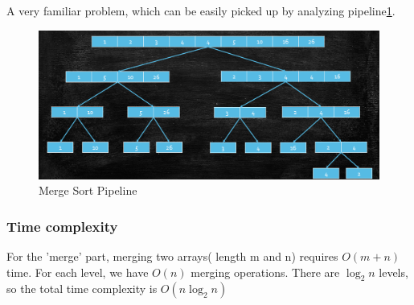 A very familiar problem, which can be easily picked up by analyzing pipeline\ref{fig:MergeSort}.
\begin{figure}
    \centering
    \includegraphics[width=0.8\linewidth]{Notes/fig/MergeSort.png}
    \caption{Merge Sort Pipeline}
    \label{fig:MergeSort}
\end{figure}

\subsubsection{Time complexity}
For the 'merge' part, merging two arrays( length m and n) requires $O(m+n)$ time. For each level, we have $O(n)$ merging operations. There are $\log_2n$ levels, so the total time complexity is $O(n\log_2n)$

